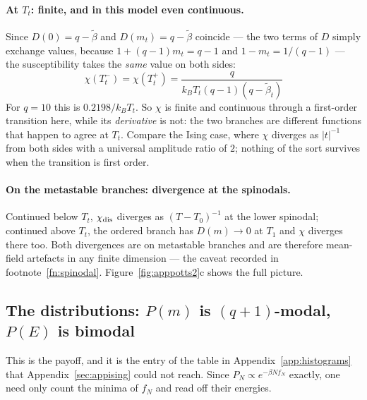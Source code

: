 \documentclass[10pt,a4paper]{article}
\theoremstyle{remark}
\begin{document}
\paragraph{At $T_t$: finite, and in this model even continuous.} Since
$D(0)=q-\tilde\beta$ and $D(m_t)=q-\tilde\beta$ coincide --- the two terms of $D$
simply exchange values, because $1+(q-1)m_t=q-1$ and $1-m_t=1/(q-1)$ --- the
susceptibility takes the \emph{same} value on both sides:
\[
\;
\chi(T_t^{-})=\chi(T_t^{+})=\frac{q}{k_BT_t(q-1)(q-\tilde\beta_t)}\
\]
For $q=10$ this is $0.2198/k_BT_t$. So $\chi$ is finite and continuous through a
first-order transition here, while its \emph{derivative} is not: the two branches
are different functions that happen to agree at $T_t$. Compare the Ising case,
where $\chi$ diverges as $|t|^{-1}$ from both sides with a universal amplitude
ratio of $2$; nothing of the sort survives when the transition is first order.

\paragraph{On the metastable branches: divergence at the spinodals.} Continued
below $T_t$, $\chi_{\rm dis}$ diverges as $(T-T_0)^{-1}$ at the lower spinodal;
continued above $T_t$, the ordered branch has $D(m)\to0$ at $T_1$ and $\chi$
diverges there too. Both divergences are on metastable branches and are therefore
mean-field artefacts in any finite dimension --- the caveat recorded in
footnote~\ref{fn:spinodal}. Figure~\ref{fig:apppotts2}c shows the full picture.

\subsection{The distributions: \texorpdfstring{$P(m)$}{P(m)} is \texorpdfstring{$(q{+}1)$}{(q+1)}-modal, \texorpdfstring{$P(E)$}{P(E)} is bimodal}
\label{sec:apppotts:distributions}

This is the payoff, and it is the entry of the table in
Appendix~\ref{app:histograms} that Appendix~\ref{sec:appising} could not reach.
Since $P_N\propto e^{-\beta Nf_N}$ exactly, one need only count the minima of
$f_N$ and read off their energies.
\end{document}
